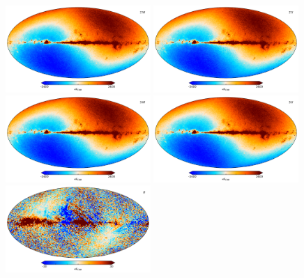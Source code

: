 \documentclass{aa}
\begin{document}
\begin{figure}[!]
  \centering
  \includegraphics[width=0.49\textwidth]{figs/map_T_27M.pdf}
  \includegraphics[width=0.49\textwidth]{figs/map_T_27S.pdf}\\
  \includegraphics[width=0.49\textwidth]{figs/map_T_28M.pdf}
  \includegraphics[width=0.49\textwidth]{figs/map_T_28S.pdf}\\
  \includegraphics[width=0.49\textwidth]{figs/map_Q_badpol.pdf}

\end{figure}
\end{document}

